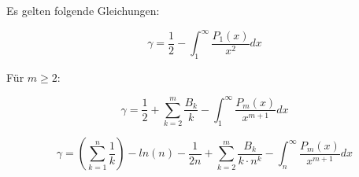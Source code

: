 \documentclass[12pt]{article}
\begin{document}
\begin{theorem}
Es gelten folgende Gleichungen:

\begin{equation}
\gamma = \frac{1}{2} - \int_1^{\infty} \frac{P_1(x)}{x^2} dx \label{eq:1}
\end{equation}

Für \(m \geq 2\):

\begin{equation}
\gamma = \frac{1}{2} + \sum_{k=2}^m \frac{B_k}{k} - \int_1^{\infty} \frac{P_m(x)}{x^{m+1}} dx \label{eq:2}
\end{equation}

\begin{equation}
\gamma = \left( \sum_{k=1}^n\frac{1}{k} \right) - ln(n) - \frac{1}{2n} + \sum_{k=2}^m \frac{B_k}{k \cdot n^k} - \int_n^{\infty} \frac{P_m(x)}{x^{m+1}} dx \label{eq:3}
\end{equation}

\end{theorem}
\end{document}
